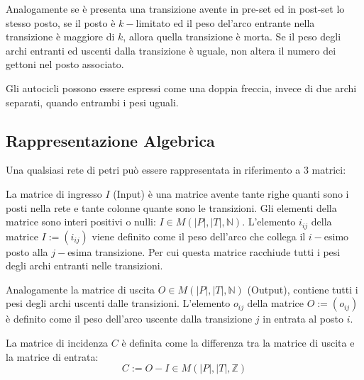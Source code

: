\documentclass{article}
\numberwithin{equation}{subsection}
\begin{document}
Analogamente se è presenta una transizione avente in pre-set ed in post-set lo stesso posto, se il posto è $k-$limitato ed il peso del'arco entrante nella transizione è maggiore 
di $k$, allora quella transizione è morta. Se il peso degli archi entranti ed uscenti dalla transizione è uguale, non altera il numero dei gettoni nel posto associato. 
\begin{center}
\end{center} 
Gli autocicli possono essere espressi come una doppia freccia, invece di due archi separati, quando entrambi i pesi uguali. 

\subsection{Rappresentazione Algebrica}

Una qualsiasi rete di petri può essere rappresentata in riferimento a $3$ matrici:


La matrice di ingresso $I$ (Input) è una matrice avente tante righe quanti sono i posti nella rete e tante colonne quante sono le transizioni. Gli elementi della matrice 
sono interi positivi o nulli: $I\in M(|P|,|T|,\mathbb{N})$. L'elemento $i_{ij}$ della matrice $I:=(i_{ij})$ viene definito come il peso dell'arco che collega il $i-$esimo posto 
alla $j-$esima transizione. Per cui questa matrice racchiude tutti i pesi degli archi entranti nelle transizioni. 

Analogamente la matrice di uscita $O\in M(|P|,|T|,\mathbb{N})$ (Output), contiene tutti i pesi degli archi uscenti dalle transizioni. L'elemento $o_{ij}$ della matrice $O:=(o_{ij})$ 
è definito come il peso dell'arco uscente dalla transizione $j$ in entrata al posto $i$. 


La matrice di incidenza $C$ è definita come la differenza tra la matrice di uscita e la matrice di entrata:
\begin{equation*}
    C:=O-I\in M(|P|,|T|,\mathbb{Z})
\end{equation*}
\end{document}

